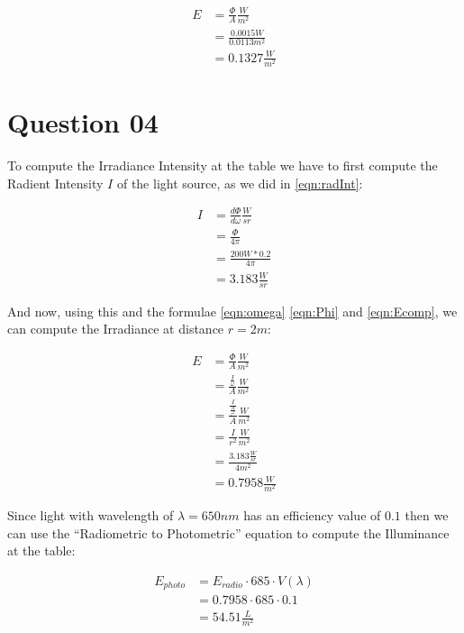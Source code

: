     \begin{align}\label{eqn:Ecomp}
      E &= \frac{\Phi}{A}\frac{W}{m^2} \\
        &= \frac{0.0015W}{0.0113m^2} \\
        &= 0.1327\frac{W}{m^2}
    \end{align}

  \section{Question 04}

    To compute the Irradiance Intensity at the table we have to first compute the Radient Intensity $I$ of the light source, as
    we did in \ref{eqn:radInt}:

    \begin{align}
      I &= \frac{d\Phi}{d\omega}\frac{W}{sr} \\
        &= \frac{\Phi}{4\pi} \\
        &= \frac{200W * 0.2}{4\pi} \\
        &= 3.183 \frac{W}{sr}
    \end{align}

    And now, using this and the formulae \ref{eqn:omega} \ref{eqn:Phi} and \ref{eqn:Ecomp}, we can compute the Irradiance at distance
    $r = 2m$:

    \begin{align}\label{eqn:Ered}
      E &= \frac{\Phi}{A}\frac{W}{m^2}  \\
        &= \frac{\frac{I}{\omega}}{A}\frac{W}{m^2}  \\
        &= \frac{\frac{I}{\frac{A}{r^2}}}{A}\frac{W}{m^2}  \\
        &= \frac{I}{r^2}\frac{W}{m^2}  \\
        &= \frac{3.183\frac{W}{sr}}{4m^2} \\
        &= 0.7958\frac{W}{m^2}
    \end{align}

    Since light with wavelength of $\lambda = 650nm$ has an efficiency value of $0.1$ then we can use the ``Radiometric to Photometric'' equation
    to compute the Illuminance at the table:

    \begin{align}
      E_{photo} &= E_{radio} \cdot 685 \cdot V(\lambda) \\
                &= 0.7958 \cdot 685 \cdot 0.1 \\
                &= 54.51\frac{L}{m^2}
    \end{align}

